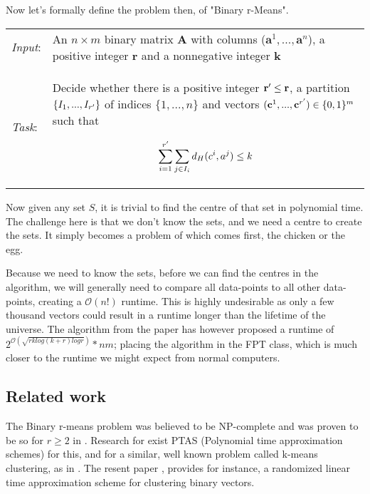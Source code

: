 \documentclass[a4paper]{article}
\begin{document}
Now let's formally define the problem then, of "Binary r-Means".
\begin{problem}
\begin{tabular}{p{}p{}}
    \textit{Input}: & An $n \times m$ binary matrix \textbf{A} with columns
    ($\textbf{a}^1,...,\textbf{a}^n$), a positive integer $\textbf{r}$ and a nonnegative
    integer $\textbf{k}$                                                                     \\

    \textit{Task}:  & Decide whether there is a positive integer $\textbf{r}\sp{\prime} \leq
        \textbf{r}$, a partition $\{I_1, ..., I_{r\sp{\prime}}\}$ of indices $\{1,...,n\}$ and vectors
    $(\textbf{c}^1,...,\textbf{c}^{r\sp{\prime}}) \in \{0,1\}^m$ such that

    \[
        \sum_{i = 1}^{r\sp{\prime}} \sum_{j \in I_i} d_H(c^i, a^j) \leq k
    \]
\end{tabular}
\end{problem}

Now given any set $S$, it is trivial to find the centre of that set in polynomial time. The challenge
here is that we don't know the sets, and we need a centre to create the sets. It simply becomes a problem
of which comes first, the chicken or the egg.

Because we need to know the sets, before we can find the centres in the algorithm, we will
generally need to compare all data-points to all other data-points, creating a $\mathcal{O}(n!)$ runtime. This
is highly undesirable as only a few thousand vectors could result in a runtime longer than the lifetime
of the universe. The algorithm from the paper \cite{fomin_golovach_panolan_2020} has however proposed a
runtime of $2^{\mathcal{O} (\sqrt{rk log(k+r) logr})}*nm$; placing the algorithm in the FPT class, which is
much closer to the runtime we might expect from normal computers.

\subsection{Related work}
The Binary r-means problem was believed to be NP-complete and was proven to be so for 
$r \geq 2$ in \cite{FeigeUriel2014Noh2}. Research for exist PTAS (Polynomial 
time approximation schemes) for this, and for a similar, well known problem called k-means clustering,
as in \cite{KumarAmit2010Lasf}. The resent paper \cite{FominFedor2020ASfL}, provides for instance, 
a randomized linear time approximation scheme for clustering binary vectors.
\end{document}

